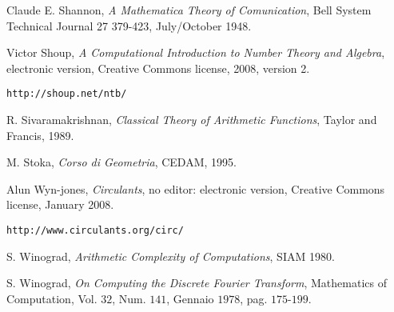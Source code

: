 \begin{thebibliography}{25}
Claude E. Shannon, \emph{A Mathematica Theory of Comunication},
Bell System Technical Journal 27 379-423, July/October 1948.

Victor Shoup, \emph{A Computational Introduction to Number Theory and Algebra},
electronic version, Creative Commons license, 2008, version 2.
\begin{verbatim}
http://shoup.net/ntb/
\end{verbatim}

R. Sivaramakrishnan, \emph{Classical Theory of Arithmetic Functions},
Taylor and Francis, 1989.

M. Stoka, \emph{Corso di Geometria},
CEDAM, 1995.

Alun Wyn-jones, \emph{Circulants}, no editor: electronic version, Creative
Commons license, January 2008.
\begin{verbatim}
http://www.circulants.org/circ/
\end{verbatim}

S. Winograd, \emph{Arithmetic Complexity of Computations}, SIAM 1980.

S. Winograd, \emph{On Computing the Discrete Fourier Transform}, Mathematics of Computation, Vol. $32$, Num. $141$, Gennaio $1978$, pag. $175$-$199$.

\end{thebibliography}




